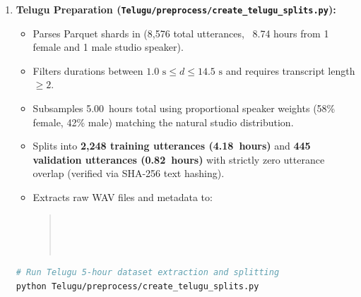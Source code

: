 \documentclass[11pt,a4paper]{report}
\begin{document}
\begin{enumerate}
    \item \textbf{Telugu Preparation (\texttt{Telugu/preprocess/create\_telugu\_splits.py}):}
    \begin{itemize}
        \item Parses Parquet shards in  (8{,}576 total utterances, ~8.74 hours from 1 female and 1 male studio speaker).
        \item Filters durations between $1.0\text{ s} \le d \le 14.5\text{ s}$ and requires transcript length $\ge 2$.
        \item Subsamples 5.00~hours total using proportional speaker weights (58\% female, 42\% male) matching the natural studio distribution.
        \item Splits into \textbf{2{,}248 training utterances (4.18~hours)} and \textbf{445 validation utterances (0.82~hours)} with strictly zero utterance overlap (verified via SHA-256 text hashing).
        \item Extracts raw WAV files and metadata to:
        \begin{quote}
        \\
        \\
        \\
        \end{quote}
    \end{itemize}
\begin{lstlisting}[language=bash]
# Run Telugu 5-hour dataset extraction and splitting
python Telugu/preprocess/create_telugu_splits.py
\end{lstlisting}
\end{enumerate}
\end{document}
